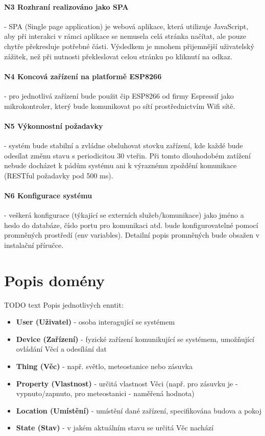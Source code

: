 \paragraph{N3 Rozhraní realizováno jako SPA}
- SPA (Single page application) je webová aplikace, která utilizuje JavaScript, aby při interakci v rámci aplikace se nemusela celá stránka načítat, ale pouze chytře překresluje potřebné části. Výsledkem je mnohem přijemnější uživatelský zážitek, než při nutnosti překleslovat celou stránku po kliknutí na odkaz.

\paragraph{N4 Koncová zařízení na platformě ESP8266}
- pro jednotlivá zařízení bude použit čip ESP8266 od firmy Espressif jako mikrokontroler, který bude komunikovat po sítí prostřednictvím Wifi sítě.

\paragraph{N5 Výkonnostní požadavky}
- systém bude stabilní a zvládne obsluhovat stovku zařízení, kde každé bude odesílat změnu stavu s periodicitou 30 vteřin. Při tomto dlouhodobém zatížení nebude docházet k pádům systému ani k výraznému zpoždění komunikace (RESTful požadavky pod 500 ms).

\paragraph{N6 Konfigurace systému} %
- veškerá konfigurace (týkající se externích služeb/komunikace) jako jméno a heslo do databáze, číslo portu pro komunikaci atd. bude konfigurovatelné pomocí promněných prostředí (env variables). Detailní popis promněných bude obsažen v instalační příručce.



\section{Popis domény}
TODO text
Popis jednotlivých enntit:
\begin{itemize}
    \item \textbf{User (Uživatel)} - osoba interagující se systémem
    \item \textbf{Device (Zařízení)} - fyzické zařízení komunikující se systémem, umožňující ovládání Věcí a odesílání dat
    \item \textbf{Thing (Věc)} - např. světlo, meteostanice nebo zásuvka
    \item \textbf{Property (Vlastnost)} - určitá vlastnost Věci (např. pro zásuvku je  - vypnuto/zapnuto, pro meteostanici  - naměřená hodnota)
    \item \textbf{Location (Umístění)} - umístění dané zařízení, specifikována budova a pokoj
    \item \textbf{State (Stav)} - v jakém aktuálním stavu se určitá Věc nachází
\end{itemize}


